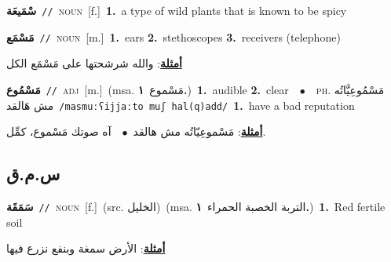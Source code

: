 \documentclass[10pt,a4paper,twoside]{article} %
\begin{document}
\begin{multicols}{2}
{\setlength\topsep{0pt}\textbf{\foreignlanguage{arabic}{سْمَيعَة}}\ {\color{gray}\texttt{//}\color{black}}\ \textsc{noun}\ [f.]\ \textbf{1.}~a type of wild plants that is known to be spicy\ } \vspace{2mm}

{\setlength\topsep{0pt}\textbf{\foreignlanguage{arabic}{مَسْمَع}}\ {\color{gray}\texttt{//}\color{black}}\ \textsc{noun}\ [m.]\ \textbf{1.}~ears  \textbf{2.}~stethoscopes  \textbf{3.}~receivers (telephone)\  \begin{flushright}\color{gray}\foreignlanguage{arabic}{\textbf{\underline{\foreignlanguage{arabic}{أمثلة}}}: والله شرشحتها على مَسْمَع الكل}\end{flushright}\color{black}} \vspace{2mm}

{\setlength\topsep{0pt}\textbf{\foreignlanguage{arabic}{مَسْمُوع}}\ {\color{gray}\texttt{//}\color{black}}\ \textsc{adj}\ [m.]\ \color{gray}(msa. \foreignlanguage{arabic}{مَسْموع}~\foreignlanguage{arabic}{\textbf{١.}})\color{black}\ \textbf{1.}~audible  \textbf{2.}~clear\ \ $\bullet$\ \ \textsc{ph.} \color{gray} \foreignlanguage{arabic}{مَسْمُوعِيَّاتُه مش هَالقد}\color{black}\ {\color{gray}\texttt{/{\sffamily masmuːʕijjaːto muʃ hal(q)add}/}\color{black}}\ \textbf{1.}~have a bad reputation\  \begin{flushright}\color{gray}\foreignlanguage{arabic}{\textbf{\underline{\foreignlanguage{arabic}{أمثلة}}}: مَسْموعِيّاتُه مش هالقد\ $\bullet$\ \  آه صوتك مَسْموع، كمِّل.}\end{flushright}\color{black}} \vspace{2mm}

\vspace{-3mm}
\subsection*{\color{blue}\foreignlanguage{arabic}{س.م.ق}\color{blue}{}} 

{\setlength\topsep{0pt}\textbf{\foreignlanguage{arabic}{سَمَقَة}}\ {\color{gray}\texttt{//}\color{black}}\ \textsc{noun}\ [f.]\ (src. \color{gray}\foreignlanguage{arabic}{الخليل}\color{black})\ \color{gray}(msa. \foreignlanguage{arabic}{التربة الخصبة الحمراء}~\foreignlanguage{arabic}{\textbf{١.}})\color{black}\ \textbf{1.}~Red fertile soil\  \begin{flushright}\color{gray}\foreignlanguage{arabic}{\textbf{\underline{\foreignlanguage{arabic}{أمثلة}}}: الأرض سمغة وبنفع نزرع فيها}\end{flushright}\color{black}} \vspace{2mm}


\end{multicols}
\end{document}
